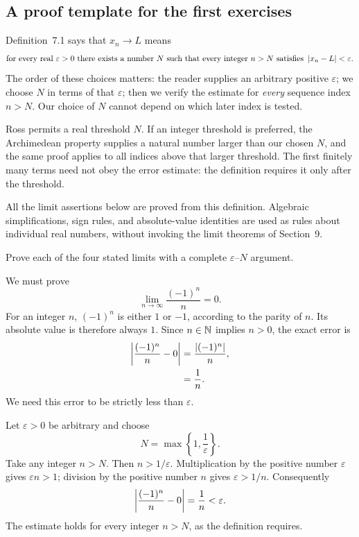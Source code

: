 \subsection*{A proof template for the first exercises}
Definition~7.1 says that $x_n\to L$ means
\[
 \text{for every real }\varepsilon>0\text{ there exists a number }N
 \text{ such that every integer }n>N\text{ satisfies }
 \left|x_n-L\right|<\varepsilon.
\]
The order of these choices matters: the reader supplies an arbitrary
positive $\varepsilon$; we choose $N$ in terms of that $\varepsilon$;
then we verify the estimate for \emph{every} sequence index $n>N$.
Our choice of $N$ cannot depend on which later index is tested.

Ross permits a real threshold $N$. If an integer threshold is preferred,
the Archimedean property supplies a natural number larger than our
chosen $N$, and the same proof applies to all indices above that larger
threshold. The first finitely many terms need not obey the error
estimate: the definition requires it only after the threshold.

All the limit assertions below are proved from this definition.
Algebraic simplifications, sign rules, and absolute-value identities are
used as rules about individual real numbers, without invoking the limit
theorems of Section~9.


\goal Prove each of the four stated limits with a complete
$\varepsilon$--$N$ argument.

We must prove
\[
 \lim_{n\to\infty}\frac{(-1)^n}{n}=0.
\]
For an integer $n$, $(-1)^n$ is either $1$ or $-1$, according to the
parity of $n$. Its absolute value is therefore always $1$. Since
$n\in\mathbb{N}$ implies $n>0$, the exact error is
\begin{align*}
 \left|\frac{(-1)^n}{n}-0\right|
   &=\frac{\left|(-1)^n\right|}{n},\\
   &=\frac1n.
\end{align*}
We need this error to be strictly less than $\varepsilon$.

Let $\varepsilon>0$ be arbitrary and choose
\[
 N=\max\left\{1,\frac1\varepsilon\right\}.
\]
Take any integer $n>N$. Then $n>1/\varepsilon$. Multiplication by
the positive number $\varepsilon$ gives $\varepsilon n>1$;
division by the positive number $n$ gives $\varepsilon>1/n$.
Consequently
\[
 \left|\frac{(-1)^n}{n}-0\right|=\frac1n<\varepsilon.
\]
The estimate holds for every integer $n>N$, as the definition requires.

